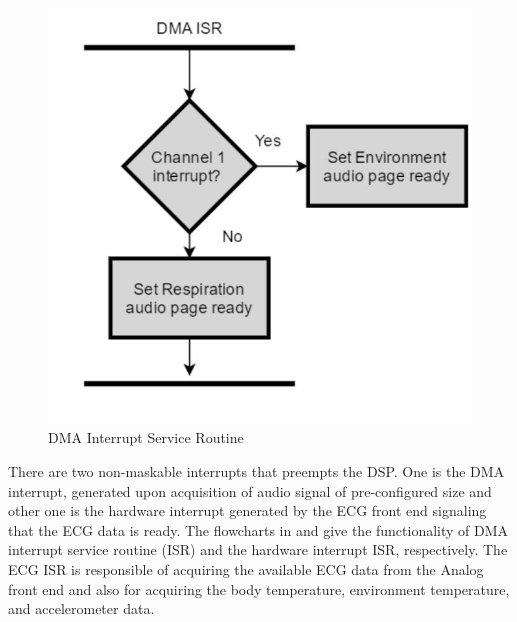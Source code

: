 \begin{figure}
	\centering
	\includegraphics[scale = 0.5 ]{dma_interrupt}
\caption{DMA Interrupt Service Routine}
\label{dma_isr}
\end{figure}

There are two non-maskable interrupts that preempts the DSP. One is
the DMA interrupt, generated upon acquisition of audio signal of
pre-configured size and other one is the hardware interrupt generated
by the ECG front end signaling that the ECG data is ready. The
flowcharts in  and  give the functionality
of DMA interrupt service routine (ISR) and the hardware interrupt
ISR, respectively. The ECG ISR is responsible of acquiring the
available ECG data from the Analog front end and also for acquiring
the body temperature, environment temperature, and accelerometer data.

